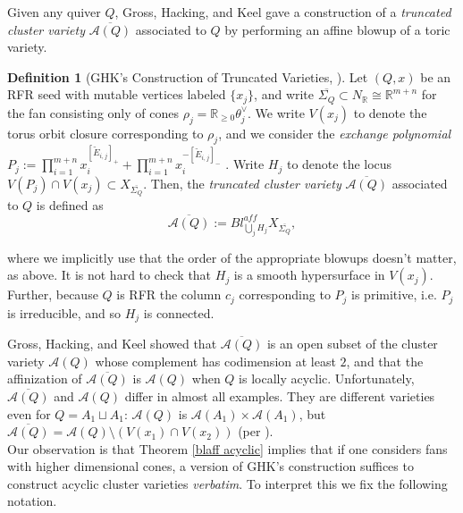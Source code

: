 \documentclass[11pt]{amsart}
\theoremstyle{definition}
\newtheorem{defn}[thm]{Definition}
\theoremstyle{remark}
\numberwithin{equation}{section}
\begin{document}
Given any quiver $Q$, Gross, Hacking, and Keel gave a construction of a \textit{truncated cluster variety} $\overline{\mathcal{A}(Q)}$ associated to $Q$ by performing an affine blowup of a toric variety.

\begin{defn}[GHK's Construction of Truncated  Varieties, \cite{GHK}]
    Let $(Q, x)$ be an RFR seed with mutable vertices labeled $\{x_j\}$, and write $\overline{\Sigma_Q} \subset N_\mathbb{R} \cong \mathbb{R}^{m+n}$ for the fan consisting only of cones $\rho_j = \mathbb{R}_{\geq 0} \theta_j^\vee$. We write $V(x_j)$ to denote the torus orbit closure corresponding to $\rho_j$, and we consider the \textit{exchange polynomial} $P_j := \prod_{i=1}^{m+n} x_i^{[\tilde{E}_{i,j}]_+} + \prod_{i=1}^{m+n} x_i^{-[\tilde{E}_{i,j}]_-}$%
    . Write $H_j$ to denote the locus $V(P_j) \cap V(x_j) \subset X_{\overline{\Sigma_Q}}$. Then, the \textit{truncated cluster variety} $\overline{\mathcal{A}(Q)}$ associated to $Q$ is defined as $$\overline{\mathcal{A}(Q)} := Bl_{\bigcup_j H_j}^{aff} X_{\overline{\Sigma_Q}},$$

    \noindent where we implicitly use that the order of the appropriate blowups doesn't matter, as above. It is not hard to check that $H_j$ is a smooth hypersurface in $V(x_j)$. Further, because $Q$ is RFR the column $c_j$ corresponding to $P_j$ is primitive, i.e. $P_j$ is irreducible, and so $H_j$ is connected.
\end{defn}

Gross, Hacking, and Keel showed that $\overline{\mathcal{A}(Q)}$ is an open subset of the cluster variety $\mathcal{A}(Q)$ whose complement has codimension at least $2$, and that the affinization of $\overline{\mathcal{A}(Q)}$ is $\mathcal{A}(Q)$ when $Q$ is locally acyclic. Unfortunately, $\overline{\mathcal{A}(Q)}$ and $\mathcal{A}(Q)$ differ in almost all examples. They are different varieties even for $Q = A_1 \sqcup A_1$: $\mathcal{A}(Q)$ is $\mathcal{A}(A_1) \times \mathcal{A}(A_1)$, but $\overline{\mathcal{A}(Q)} = \mathcal{A}(Q) \setminus (V(x_1) \cap V(x_2))$ (per \cite{GL}).\\

Our observation is that Theorem \ref{blaff acyclic} implies that if one considers fans with higher dimensional cones, a version of GHK's construction suffices to construct acyclic cluster varieties \textit{verbatim}. To interpret this we fix the following notation.
\end{document}
